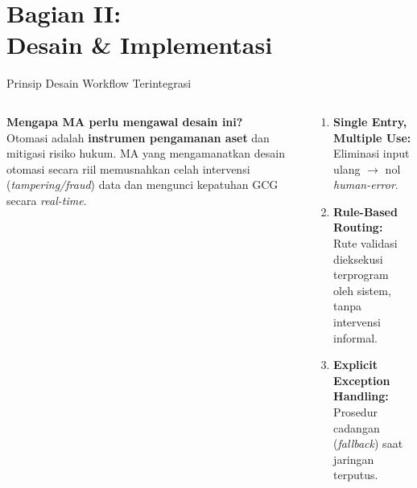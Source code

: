 \documentclass[aspectratio=169,11pt]{beamer}
\begin{document}

\section{Bagian II:\\Desain \& Implementasi}

\begin{frame}{Prinsip Desain Workflow Terintegrasi}
    \vspace{0.2cm}
    \begin{columns}[T]
        \begin{premiumbox}
            \scriptsize
            \textbf{Mengapa MA perlu mengawal desain ini?}\\[0.1cm]
            Otomasi adalah \textbf{instrumen pengamanan aset} dan mitigasi risiko hukum. MA yang mengamanatkan desain otomasi secara riil memusnahkan celah intervensi (\textit{tampering/fraud}) data dan mengunci kepatuhan GCG secara \textit{real-time}.
        \end{premiumbox}
        
        \begin{orangebox}
            \scriptsize
            \begin{enumerate}
                \item \textbf{Single Entry, Multiple Use:}\\Eliminasi input ulang $\rightarrow$ nol \textit{human-error}.
                \item \textbf{Rule-Based Routing:}\\Rute validasi dieksekusi terprogram oleh sistem, tanpa intervensi informal.
                \item \textbf{Explicit Exception Handling:}\\Prosedur cadangan (\textit{fallback}) saat jaringan terputus.
            \end{enumerate}
        \end{orangebox}
    \end{columns}
\end{frame}
\end{document}
